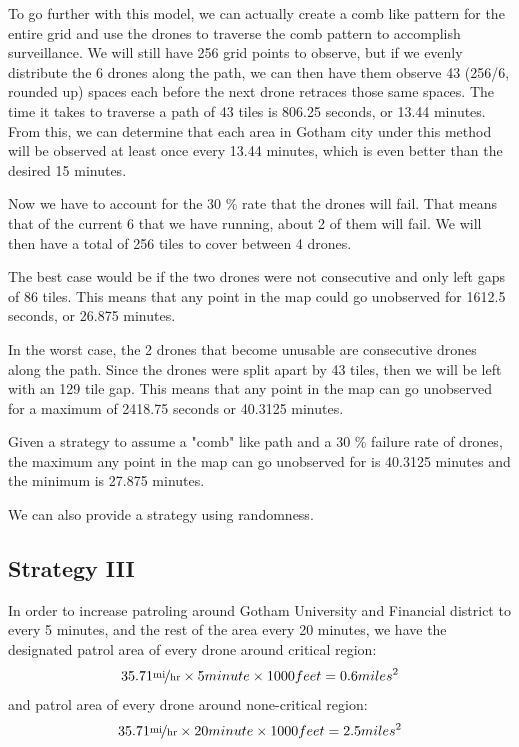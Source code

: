 \documentclass{article}
\begin{document}
To go further with this model, we can actually create a comb like pattern for the entire grid and use the drones to traverse the comb pattern to accomplish surveillance. We will still have 256 grid points to observe, but if we evenly distribute the 6 drones along the path, we can then have them observe 43 (256/6, rounded up) spaces each before the next drone retraces those same spaces. The time it takes to traverse a path of 43 tiles is 806.25 seconds, or 13.44 minutes. From this, we can determine that each area in Gotham city under this method will be observed at least once every 13.44 minutes, which is even better than the desired 15 minutes. 

Now we have to account for the 30 \% rate that the drones will fail. That means that of the current 6 that we have running, about 2 of them will fail. We will then have a total of 256 tiles to cover between 4 drones. 

The best case would be if the two drones were not consecutive and only left gaps of 86 tiles. This means that any point in the map could go unobserved for 1612.5 seconds, or 26.875 minutes. 

In the worst case, the 2 drones that become unusable are consecutive drones along the path. Since the drones were split apart by 43 tiles, then we will be left with an 129 tile gap. This means that any point in the map can go unobserved for a maximum of 2418.75 seconds or 40.3125 minutes. 

Given a strategy to assume a "comb" like path and a 30 \% failure rate of drones, the maximum any point in the map can go unobserved for is 40.3125 minutes and the minimum is 27.875 minutes. 

We can also provide a strategy using randomness. 

\subsection{Strategy III}

In order to increase patroling around Gotham University and Financial district to every 5 minutes, and the rest of the area every 20 minutes, we have the designated patrol area of every drone around critical region:
\begin{equation}
35.71 \unitfrac{mi}{hr} \times 5 minute \times 1000 feet = 0.6 miles^2
\end{equation}
and patrol area of every drone around none-critical region:
\begin{equation}
35.71 \unitfrac{mi}{hr} \times 20 minute \times 1000 feet = 2.5 miles^2
\end{equation}
\end{document}
